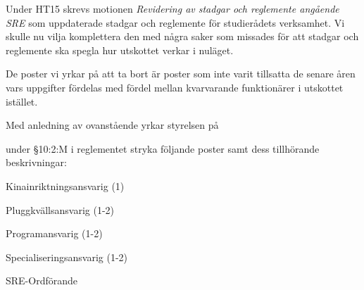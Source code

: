 \documentclass[../_main/handlingar.tex]{subfiles}
\begin{document}

Under HT15 skrevs motionen \emph{Revidering av stadgar och reglemente angående SRE} som uppdaterade stadgar och reglemente för studierådets verksamhet. Vi skulle nu vilja komplettera den med några saker som missades för att stadgar och reglemente ska spegla hur utskottet verkar i nuläget.

De poster vi yrkar på att ta bort är poster som inte varit tillsatta de senare åren vars uppgifter fördelas med fördel mellan kvarvarande funktionärer i utskottet istället.

Med anledning av ovanstående yrkar styrelsen på
\begin{attsatser}
    \att under \S10:2:M  i reglementet stryka följande poster samt dess tillhörande beskrivningar:\par
    \begin{itshape}
        \begin{itemizedash}
        	\item {Kinainriktningsansvarig (1)}
            \item {Pluggkvällsansvarig (1-2)}
            \item {Programansvarig (1-2)}
            \item {Specialiseringsansvarig (1-2)}
        \end{itemizedash}
    \end{itshape}
\end{attsatser}

\begin{signatures}{1}
    \ist
    \signature{Johan Persson}{SRE-Ordförande}
\end{signatures}
\end{document}
